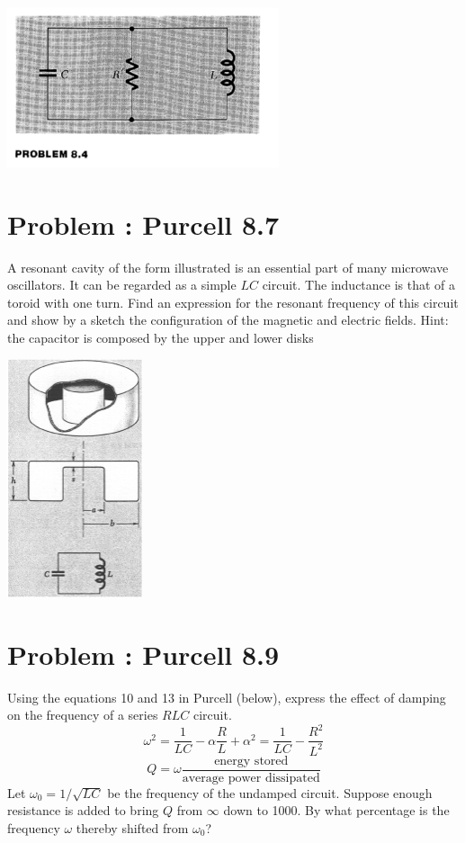 \documentclass[problems]{esg8022pset}
\begin{document}
  \begin{center}
    \includegraphics[width = 0.6\textwidth]{figpu804}
  \end{center}
\section{Problem \thesection: Purcell 8.7}
  A resonant cavity of the form illustrated is an essential part of many
  microwave oscillators. It can be regarded as a simple $LC$ circuit. The
  inductance is that of a toroid with one turn. Find an expression for the
  resonant frequency of this circuit and show by a sketch the configuration
  of the magnetic and electric fields.
  Hint: the capacitor is composed by the upper and lower disks
  \begin{center}
    \includegraphics[width = 4cm]{pu807}
  \end{center}
\section{Problem \thesection: Purcell 8.9}
  Using the equations 10 and 13 in Purcell (below), express the effect of
  damping on the frequency of a series $RLC$ circuit.
  \begin{equation*}
    \omega^2 = \frac{1}{LC} - \alpha\frac{R}{L} + \alpha^2 = \frac{1}{LC} - \frac{R^2}{L^2}
  \end{equation*}
  \begin{equation*}
    Q = \omega \frac{\text{energy stored}}{\text{average power dissipated}}
  \end{equation*}
  Let $\omega_0 = 1 / \sqrt{LC}$ be the frequency of the undamped circuit.
  Suppose enough resistance is added to bring $Q$ from $\infty$ down to
  1000.  By what percentage is the frequency $\omega$ thereby shifted from
  $\omega_0$?
\end{document}
